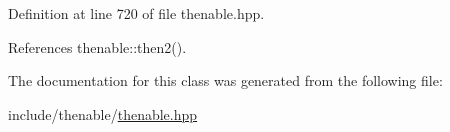 Definition at line 720 of file thenable.\+hpp.



References thenable\+::then2().



The documentation for this class was generated from the following file\+:\begin{DoxyCompactItemize}
\item 
include/thenable/\hyperlink{thenable_8hpp}{thenable.\+hpp}\end{DoxyCompactItemize}
